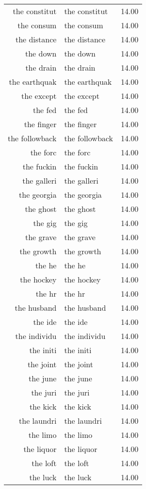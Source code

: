 \begin{table}[ht]
\begin{tabular}{rlr}
  the constitut & the constitut & 14.00 \\ 
  the consum & the consum & 14.00 \\ 
  the distance & the distance & 14.00 \\ 
  the down & the down & 14.00 \\ 
  the drain & the drain & 14.00 \\ 
  the earthquak & the earthquak & 14.00 \\ 
  the except & the except & 14.00 \\ 
  the fed & the fed & 14.00 \\ 
  the finger & the finger & 14.00 \\ 
  the followback & the followback & 14.00 \\ 
  the forc & the forc & 14.00 \\ 
  the fuckin & the fuckin & 14.00 \\ 
  the galleri & the galleri & 14.00 \\ 
  the georgia & the georgia & 14.00 \\ 
  the ghost & the ghost & 14.00 \\ 
  the gig & the gig & 14.00 \\ 
  the grave & the grave & 14.00 \\ 
  the growth & the growth & 14.00 \\ 
  the he & the he & 14.00 \\ 
  the hockey & the hockey & 14.00 \\ 
  the hr & the hr & 14.00 \\ 
  the husband & the husband & 14.00 \\ 
  the ide & the ide & 14.00 \\ 
  the individu & the individu & 14.00 \\ 
  the initi & the initi & 14.00 \\ 
  the joint & the joint & 14.00 \\ 
  the june & the june & 14.00 \\ 
  the juri & the juri & 14.00 \\ 
  the kick & the kick & 14.00 \\ 
  the laundri & the laundri & 14.00 \\ 
  the limo & the limo & 14.00 \\ 
  the liquor & the liquor & 14.00 \\ 
  the loft & the loft & 14.00 \\ 
  the luck & the luck & 14.00 \\ 

\end{tabular}
\end{table}
